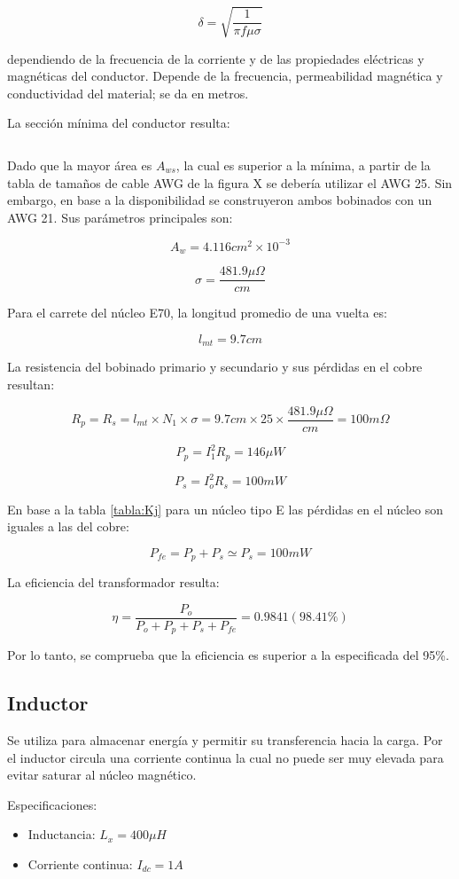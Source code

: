 $$ \delta=\sqrt{\frac{1}{\pi f\mu\sigma}} $$

dependiendo de la frecuencia de la corriente y de las propiedades eléctricas y magnéticas del conductor.
Depende de la frecuencia, permeabilidad magnética y conductividad del material; se da en metros.

La sección mínima del conductor resulta:

$$ $$

Dado que la mayor área es $A_{ws}$, la cual es superior a la mínima, a partir de la tabla de tamaños de cable AWG de la figura X se debería utilizar el AWG 25.
Sin embargo, en base a la disponibilidad se construyeron ambos bobinados con un AWG 21. 
Sus parámetros principales son:

$$ A_{w}=4.116cm^2 \times10^{-3} $$

$$ \sigma=\frac{481.9\mu\Omega}{cm} $$

Para el carrete del núcleo E70, la longitud promedio de una vuelta es: 

$$ l_{mt}=9.7cm $$

La resistencia del bobinado primario y secundario y sus pérdidas en el cobre resultan:

$$ R_p=R_s=l_{mt}\times N_{1}\times\sigma=9.7cm \times25 \times\frac{481.9\mu\Omega}{cm}=100m\Omega $$

$$ P_p=I_1^2R_p=146\mu W $$

$$ P_s=I_o^2R_s=100mW $$

En base a la tabla \ref{tabla:Kj} para un núcleo tipo E las pérdidas en el núcleo son iguales a las del cobre:

$$ P_{fe}=P_p+P_s \simeq P_s=100mW $$

La eficiencia del transformador resulta:

$$ \eta=\frac{P_o}{P_o+P_p+P_s+P_{fe}}=0.9841 (98.41\%) $$

Por lo tanto, se comprueba que la eficiencia es superior a la especificada del 95\%.  

\subsection{Inductor}

Se utiliza para almacenar energía y permitir su transferencia hacia la carga. 
Por el inductor circula una corriente continua la cual no puede ser muy elevada para evitar saturar al núcleo magnético. 

Especificaciones: 

\begin{itemize}
    \item Inductancia: $L_x=400\mu H$
    \item Corriente continua: $I_{dc}=1A$
\end{itemize}

